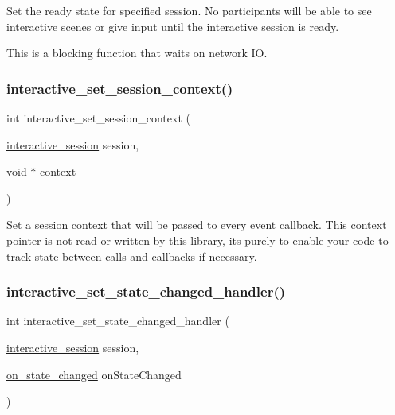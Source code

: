 Set the ready state for specified session. No participants will be able to see interactive scenes or give input until the interactive session is ready. 

This is a blocking function that waits on network IO. \mbox{\label{group___interactivity_ga1c988b20ef84417816c0f9ba05c1c41c}} 
\subsubsection{\texorpdfstring{interactive\+\_\+set\+\_\+session\+\_\+context()}{interactive\_set\_session\_context()}}
{\footnotesize\ttfamily int interactive\+\_\+set\+\_\+session\+\_\+context (\begin{DoxyParamCaption}\item[{\mbox{\hyperlink{group___interactivity_ga6d8819d38b8dc8994a2299cf22a65a31}{interactive\+\_\+session}}}]{session,  }\item[{void $\ast$}]{context }\end{DoxyParamCaption})}



Set a session context that will be passed to every event callback. This context pointer is not read or written by this library, it\textquotesingle{}s purely to enable your code to track state between calls and callbacks if necessary. 

\mbox{\label{group___interactivity_ga082b1797dc40ac1fa9abcaedf0502d89}} 
\subsubsection{\texorpdfstring{interactive\+\_\+set\+\_\+state\+\_\+changed\+\_\+handler()}{interactive\_set\_state\_changed\_handler()}}
{\footnotesize\ttfamily int interactive\+\_\+set\+\_\+state\+\_\+changed\+\_\+handler (\begin{DoxyParamCaption}\item[{\mbox{\hyperlink{group___interactivity_ga6d8819d38b8dc8994a2299cf22a65a31}{interactive\+\_\+session}}}]{session,  }\item[{\mbox{\hyperlink{group___interactivity_ga2decafcde365ca3bc6907760ef4fcc5f}{on\+\_\+state\+\_\+changed}}}]{on\+State\+Changed }\end{DoxyParamCaption})}



